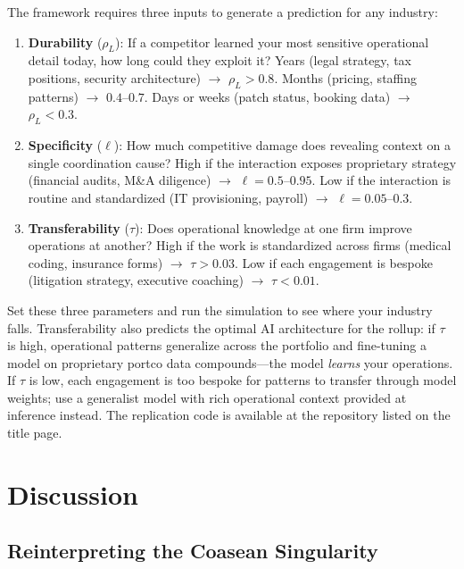 \documentclass[12pt]{article}
\theoremstyle{definition}
\begin{document}
\begin{remark}
The framework requires three inputs to generate a prediction for any industry:
\begin{enumerate}[leftmargin=*]
\item \textbf{Durability} ($\rho_L$): If a competitor learned your most sensitive operational detail today, how long could they exploit it? Years (legal strategy, tax positions, security architecture) $\to$ $\rho_L > 0.8$. Months (pricing, staffing patterns) $\to$ $0.4$--$0.7$. Days or weeks (patch status, booking data) $\to$ $\rho_L < 0.3$.

\item \textbf{Specificity} ($\ell$): How much competitive damage does revealing context on a single coordination cause? High if the interaction exposes proprietary strategy (financial audits, M\&A diligence) $\to$ $\ell = 0.5$--$0.95$. Low if the interaction is routine and standardized (IT provisioning, payroll) $\to$ $\ell = 0.05$--$0.3$.

\item \textbf{Transferability} ($\tau$): Does operational knowledge at one firm improve operations at another? High if the work is standardized across firms (medical coding, insurance forms) $\to$ $\tau > 0.03$. Low if each engagement is bespoke (litigation strategy, executive coaching) $\to$ $\tau < 0.01$.
\end{enumerate}
\noindent Set these three parameters and run the simulation to see where your industry falls. Transferability also predicts the optimal AI architecture for the rollup: if $\tau$ is high, operational patterns generalize across the portfolio and fine-tuning a model on proprietary portco data compounds---the model \textit{learns} your operations. If $\tau$ is low, each engagement is too bespoke for patterns to transfer through model weights; use a generalist model with rich operational context provided at inference instead. The replication code is available at the repository listed on the title page.
\end{remark}

\section{Discussion}

\subsection{Reinterpreting the Coasean Singularity}
\end{document}
